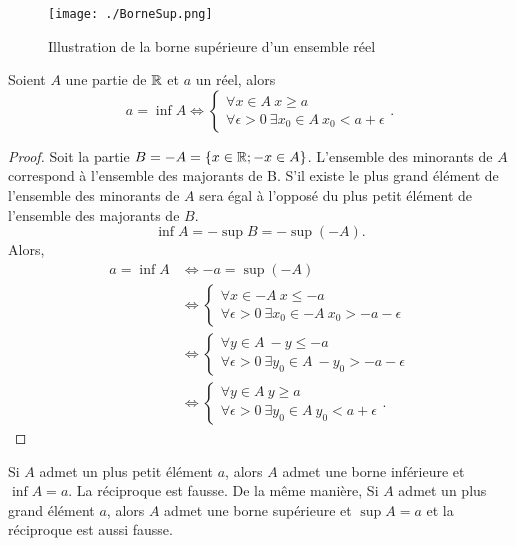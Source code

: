 \begin{figure}[h]
    \centering
    \texttt{[image: ./BorneSup.png]}
    \caption{Illustration de la borne supérieure d'un ensemble réel}
    \label{fig:BorneSup}
\end{figure}
\begin{theo}
  Soient \(A\) une partie de \(\mathbb{R}\) et \(a\) un réel, alors
  \begin{equation}
    a=\inf A \iff \begin{cases} \forall x \in A \ x\geqslant a \\  \forall \epsilon >0 \ \exists x_0\in A \ x_0<a+\epsilon\end{cases}.
  \end{equation}
\end{theo}
\begin{proof}
  Soit la partie \(B=-A=\{x\in\mathbb{R}; -x\in A\}\). L'ensemble des minorants de \(A\) correspond à l'ensemble des majorants de B. S'il existe le plus grand élément de l'ensemble des minorants de \(A\) sera égal à l'opposé du plus petit élément de l'ensemble des majorants de \(B\).
  \begin{equation}
    \inf A=-\sup B=-\sup(-A).
  \end{equation}
Alors,
\begin{align}
  a=\inf A &\iff -a=\sup(-A)\\
  &\iff \begin{cases} \forall x \in -A \ x\leqslant -a \\ \forall \epsilon>0 \ \exists x_0 \in -A \ x_0>-a-\epsilon \end{cases}\\
  &\iff \begin{cases} \forall y \in A \ -y\leqslant -a \\ \forall \epsilon>0 \ \exists y_0 \in A \ -y_0>-a-\epsilon \end{cases}\\
  &\iff \begin{cases} \forall y \in A \ y\geqslant a \\ \forall \epsilon>0 \ \exists y_0 \in A \ y_0<a+\epsilon \end{cases}.
\end{align}
\end{proof}

Si \(A\) admet un plus petit élément \(a\), alors \(A\) admet une borne inférieure et \(\inf A=a\). La réciproque est fausse. De la même manière, Si \(A\) admet un plus grand élément \(a\), alors \(A\) admet une borne supérieure et \(\sup A=a\) et la réciproque est aussi fausse.

